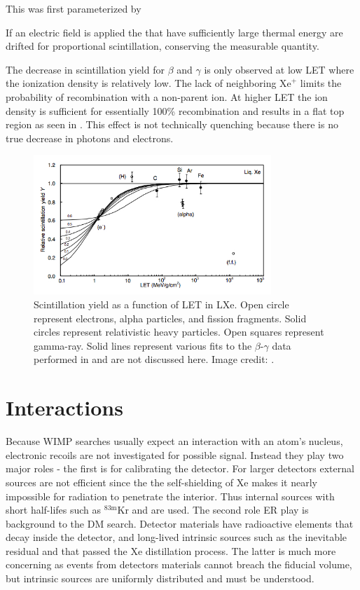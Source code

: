 This was first parameterized by 



If an electric field is applied the \electron that have sufficiently large thermal energy are drifted for
proportional scintillation, conserving the measurable quantity.

The decrease in scintillation yield for $\beta$ and $\gamma$ is only observed at low LET where the ionization density is relatively low.  The
lack of neighboring $\mathrm{Xe}^{+}$ limits the probability of recombination with a non-parent ion.  At higher LET the ion density
is sufficient for essentially 100\% recombination and results in a flat top region as seen in .  This
effect is not technically quenching because there is no true decrease in photons and electrons.

\begin{figure}
\includegraphics[width=0.8\textwidth]{ScintillationYield}
\caption{Scintillation yield as a function of LET in LXe.  Open circle represent electrons, alpha particles, and fission fragments.  Solid
circles represent relativistic heavy particles.  Open squares represent gamma-ray.  Solid lines represent various fits to the
$\beta$-$\gamma$
data performed in  and are not discussed here.  Image credit: .}
\label{fig:scintillation_yield}
\end{figure}



\section{Interactions}
\label{sec:interactions}
Because WIMP searches usually expect an interaction with an atom's nucleus, electronic recoils are not investigated for possible
signal.  Instead they play two major roles - the first is for calibrating the detector.  For larger detectors external sources are
not efficient since the the self-shielding of Xe makes it nearly impossible for radiation to penetrate the interior.  Thus internal
sources with short half-lifes such as $\mathrm{^{83m}Kr}$ and \radoncal are used.  The second role ER play is background to the DM
search.  Detector materials have radioactive elements that decay inside the detector, and long-lived intrinsic sources such as
the inevitable residual \krypton and \radon that passed the Xe distillation process.  The latter is much more concerning as events from
detectors materials cannot breach the fiducial volume, but intrinsic sources are uniformly distributed and must be understood.

